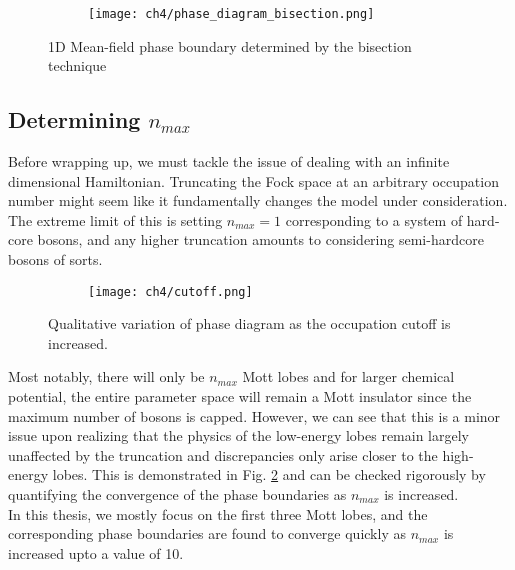 \begin{figure}[!htb]
    \centering
    \begin{subfigure}[b]{0.75\textwidth}  %
        \centering
        \texttt{[image: ch4/phase\_diagram\_bisection.png]}
    \end{subfigure}
    \caption{1D Mean-field phase boundary determined by the bisection technique}
    \label{}
\end{figure}
\FloatBarrier \!\!\!\!\!\!\!\!\!\!\!

\subsection{Determining $n_{max}$}\label{sec:nmax}
Before wrapping up, we must tackle the issue of dealing with an infinite dimensional Hamiltonian. Truncating the Fock space at an arbitrary occupation number might seem like it fundamentally changes the model under consideration. The extreme limit of this is setting $n_{max} = 1$ corresponding to a system of hard-core bosons, and any higher truncation amounts to considering semi-hardcore bosons of sorts.
\begin{figure}[!htb]
    \centering
    \begin{subfigure}[b]{0.75\textwidth}  %
        \centering
        \texttt{[image: ch4/cutoff.png]}
    \end{subfigure}
    \caption{Qualitative variation of phase diagram as the occupation cutoff is increased.}
    \label{fig:nmax}
\end{figure}
\FloatBarrier \!\!\!\!\!\!\!\!\!\!\!

Most notably, there will only be $n_{max}$ Mott lobes and for larger chemical potential, the entire parameter space will remain a Mott insulator since the maximum number of bosons is capped. However, we can see that this is a minor issue upon realizing that the physics of the low-energy lobes remain largely unaffected by the truncation and discrepancies only arise closer to the high-energy lobes. This is demonstrated in Fig. \ref{fig:nmax} and can be checked rigorously by quantifying the convergence of the phase boundaries as $n_{max}$ is increased.
\vspace{0.5cm}\\
In this thesis, we mostly focus on the first three Mott lobes, and the corresponding phase boundaries are found to converge quickly as $n_{max}$ is increased upto a value of 10.

